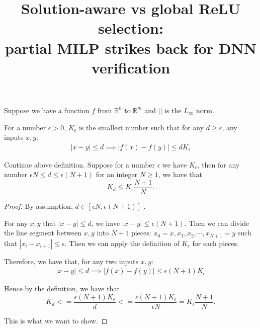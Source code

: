 \documentclass{llncs}
\title{Solution-aware vs global ReLU selection: \\
partial MILP strikes back for DNN verification}
\date{}
\begin{document}
\begin{definition}
	Suppose we have a function $f$ from $\mathbb{R}^n$ to $\mathbb{R}^m$ and $||$ is the $L_\infty$ norm. 
	
	For a number $\epsilon > 0$, $K_\epsilon$ is the smallest number such that for any $d\geq \epsilon$, any inputs $x,y$:\begin{align*}
	 |x-y| \leq d \implies |f(x)-f(y)| \leq dK_\epsilon 
	\end{align*}
\end{definition}



\begin{proposition}
	
	Continue above definition. Suppose for a number $\epsilon$ we have $K_\epsilon$, then for any number $ \epsilon N\leq d\leq \epsilon(N+1)$ for an integer $N \geq 1$, we have that $$K_d \leq K_\epsilon\frac{N+1}{N}.$$
\end{proposition}

\begin{proof}
By assumption, $d \in [\epsilon N  , \epsilon(N+1)]$ . 

	For any $x, y$ that $|x-y| \leq d$, we have $|x-y| \leq \epsilon(N+1) $. Then we can divide the line segment between $x, y$ into $N+1$ pieces: $x_0 = x, x_1, x_2, \cdots, x_{N+1} = y$ such that $|x_i-x_{i+1}| \leq \epsilon$. Then we can apply the definition of $K_\epsilon$ for each pieces. 
	
	Therefore, we have that, for any two inputs $x,y$:
		\begin{align*}
		|x-y| \leq d \implies |f(x)-f(y)| \leq  \epsilon(N+1) K_\epsilon
	\end{align*}
	
	Hence by the definition, we have that $$K_d <= \dfrac{\epsilon(N+1) K_\epsilon }{d}<=\dfrac{\epsilon(N+1)K_\epsilon}{\epsilon N} = K_\epsilon\frac{N+1}{N}.$$
	
	This is what we want to show.
	

\end{proof}
\end{document}
